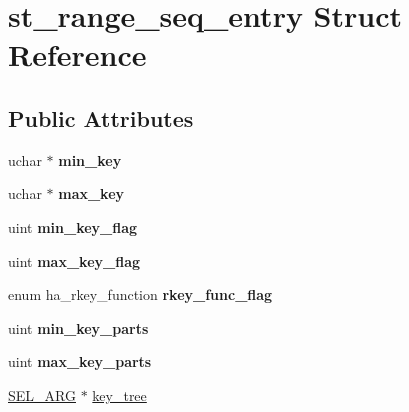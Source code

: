 \hypertarget{structst__range__seq__entry}{}\section{st\+\_\+range\+\_\+seq\+\_\+entry Struct Reference}
\label{structst__range__seq__entry}
\subsection*{Public Attributes}
\begin{DoxyCompactItemize}
\item 
\mbox{\label{structst__range__seq__entry_ae3c529da0302103f007756b9c5de654e}} 
uchar $\ast$ {\bfseries min\+\_\+key}
\item 
\mbox{\label{structst__range__seq__entry_a1082beb11ea6aceff7f16b3d2e0ac553}} 
uchar $\ast$ {\bfseries max\+\_\+key}
\item 
\mbox{\label{structst__range__seq__entry_a172ce318f97dd2e7822b95010a284f6b}} 
uint {\bfseries min\+\_\+key\+\_\+flag}
\item 
\mbox{\label{structst__range__seq__entry_afe005c8f767e790a75fecea22a6bbdf5}} 
uint {\bfseries max\+\_\+key\+\_\+flag}
\item 
\mbox{\label{structst__range__seq__entry_a3f3164201ab5a404de7e490b3f0aa352}} 
enum ha\+\_\+rkey\+\_\+function {\bfseries rkey\+\_\+func\+\_\+flag}
\item 
\mbox{\label{structst__range__seq__entry_a33cf5816c723b4c7836e0f1cde016731}} 
uint {\bfseries min\+\_\+key\+\_\+parts}
\item 
\mbox{\label{structst__range__seq__entry_ac4c8f92cd31777e1dc29747d973adff2}} 
uint {\bfseries max\+\_\+key\+\_\+parts}
\item 
\mbox{\hyperlink{classSEL__ARG}{S\+E\+L\+\_\+\+A\+RG}} $\ast$ \mbox{\hyperlink{structst__range__seq__entry_a2eb5297b7ad3342bd4bb40d95fa7d839}{key\+\_\+tree}}
\end{DoxyCompactItemize}


